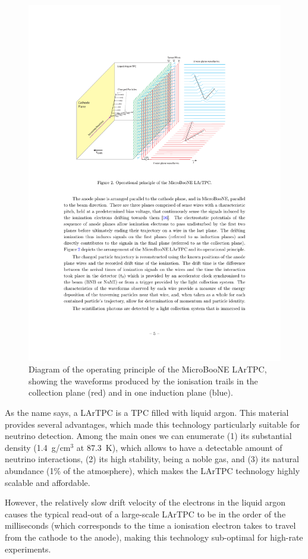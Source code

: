 \begin{figure}[htbp]
    \centering
    \includegraphics[width=0.8\linewidth]{figures/lartpc_diagram.pdf}
    \caption{Diagram of the operating principle of the MicroBooNE LArTPC, showing the waveforms produced by the ionisation trails in the collection plane (red) and in one induction plane (blue).}
    \label{fig:lartpc_diagram}
\end{figure}

As the name says, a LArTPC is a TPC filled with liquid argon. This material provides several advantages, which made this technology particularly suitable for neutrino detection. Among the main ones we can enumerate (1) its substantial density (1.4~g/cm$^3$ at 87.3~K), which allows to have a detectable amount of neutrino interactions, (2) its high stability, being a noble gas, and (3) its natural abundance (1\% of the atmosphere), which makes the LArTPC technology highly scalable and affordable.

However, the relatively slow drift velocity of the electrons in the liquid argon causes the typical read-out of a large-scale LArTPC to be in the order of the milliseconds (which corresponds to the time a ionisation electron takes to travel from the cathode to the anode), making this technology sub-optimal for high-rate experiments. 


